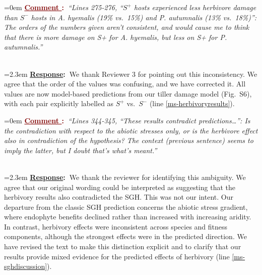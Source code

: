 \documentclass[12pt]{article}
\newcounter{cN}
\newcommand{\comment}[1]{
	\vspace{2em}
	\refstepcounter{cN} %
	\noindent \hangindent=0em \textbf{\textcolor{Maroon}{\uline{Comment \thecN}:~}}\emph{``#1''}
	}
\newcommand{\response}[1]{
	\\[0.25em]
	\hangindent=2.3em \textbf{\textcolor{NavyBlue}{\uline{Response}:~}}#1
	}
\providecommand{\uline}[1]{\underline{#1}}
\begin{document}
\comment{Lines 275-276, ``$S^+$ hosts experienced less herbivore damage than $S^-$ hosts in \textit{A. hyemalis} (19\% vs.\ 15\%) and \textit{P. autumnalis} (13\% vs.\ 18\%)'': The orders of the numbers given aren't consistent, and would cause me to think that there is more damage on S+ for \textit{A. hyemalis}, but less on S+ for \textit{P. autumnalis}.}
\response{We thank Reviewer 3 for pointing out this inconsistency. We agree that the order of the values was confusing, and we have corrected it. All values are now model-based predictions from our tiller damage model (Fig.~S6), with each pair explicitly labelled as $S^+$ vs.\ $S^-$ (line \ref{ms-herbivoryresults}).}

\comment{Lines 344-345, ``These results contradict predictions\ldots'': Is the contradiction with respect to the abiotic stresses only, or is the herbivore effect also in contradiction of the hypothesis? The context (previous sentence) seems to imply the latter, but I doubt that's what's meant.}
\response{We thank the reviewer for identifying this ambiguity. We agree that our original wording could be interpreted as suggesting that the herbivory results also contradicted the SGH. This was not our intent. Our departure from the classic SGH prediction concerns the abiotic stress gradient, where endophyte benefits declined rather than increased with increasing aridity. In contrast, herbivory effects were inconsistent across species and fitness components, although the strongest effects were in the predicted direction. We have revised the text to make this distinction explicit and to clarify that our results provide mixed evidence for the predicted effects of herbivory (line \ref{ms-sghdiscussion}).
}
\end{document}
